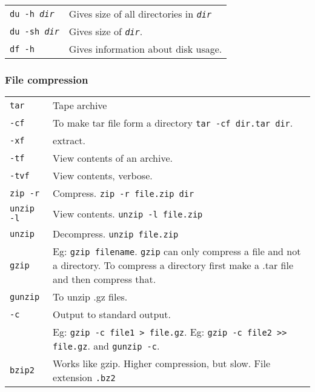 \begin{tabularx}{\linewidth}{lX}
    \texttt{du -h \textit{dir}}     & Gives size of all directories in \texttt{\textit{dir}}\\
    \texttt{du -sh \textit{dir}}    & Gives size of \texttt{\textit{dir}}.\\
    \texttt{df -h}                  & Gives information about disk usage.\\
    \hline

\end{tabularx}

\subsubsection{File compression}


\begin{tabularx}{\linewidth}{lX}

    \texttt{tar}            & Tape archive\\
    \texttt{-cf}            & To make tar file form a directory \texttt{tar -cf dir.tar dir}.\\
    \texttt{-xf}            & extract.\\
    \texttt{-tf}            & View contents of an archive.\\
    \texttt{-tvf}           & View contents, verbose.\\
    \hline

    \texttt{zip -r}         & Compress. \texttt{zip -r file.zip dir}\\
    \texttt{unzip -l}       & View contents. \texttt{unzip -l file.zip}\\
    \texttt{unzip}          & Decompress. \texttt{unzip file.zip}\\
    \hline

    \texttt{gzip}           & Eg: \texttt{gzip filename}. \texttt{gzip} can only compress a file and not a directory. To compress a directory first make a .tar file and then compress that.\\
    \texttt{gunzip}         & To unzip .gz files.\\
    \texttt{-c}             & Output to standard output. \\
                            & Eg: \texttt{gzip -c file1 >  file.gz}. Eg: \texttt{gzip -c file2 >> file.gz}. and \texttt{gunzip -c}.\\
    \texttt{bzip2}          & Works like gzip. Higher compression, but slow. File extension \texttt{.bz2}\\
    \hline

\end{tabularx}


